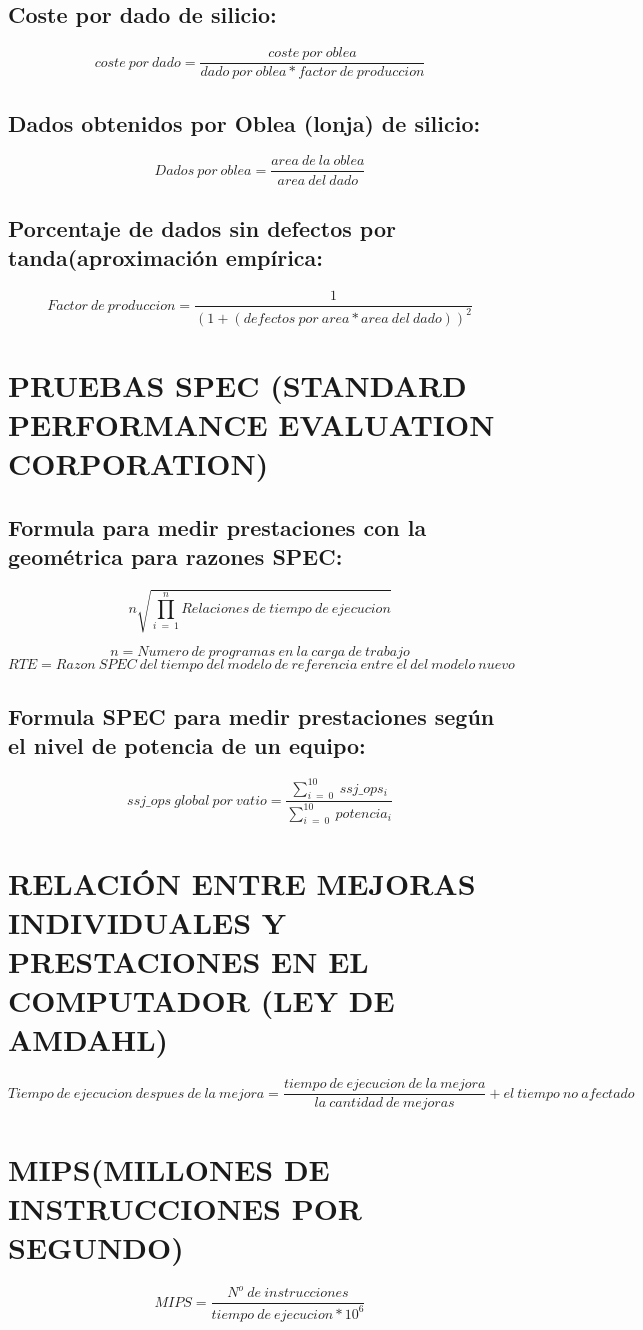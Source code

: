 \documentclass{article}
\begin{document}
\subsection{Coste por dado de silicio:}

$$coste\ por\ dado = \frac{coste\ por\ oblea}{dado\ por\ oblea * factor\ de\ produccion}$$

\subsection{Dados obtenidos por Oblea (lonja) de silicio:}

$$Dados\ por\ oblea = \frac{area\ de\ la\ oblea}{area\ del\ dado}$$

\subsection{Porcentaje de dados sin defectos por tanda(aproximación empírica:}

$$Factor\ de\ produccion =\frac{1}{(1 + (defectos\ por\ area * area\ del\ dado))^2}$$

\section{ \uppercase{Pruebas SPEC (Standard Performance Evaluation Corporation)} }

\subsection{Formula para medir prestaciones con la geométrica para razones SPEC:}

$$n\sqrt{\prod_{i\ =\ 1}^{n} Relaciones\ de\ tiempo\ de\ ejecucion}$$

$$n = Numero\ de\ programas\ en\ la\ carga\ de\ trabajo$$
$$RTE = Razon\ SPEC\ del\ tiempo\ del\ modelo\ de\ referencia\ entre\ el\ del\ modelo\ nuevo$$


\subsection{Formula SPEC para medir prestaciones según el nivel de potencia de un equipo:}

$$ssj\_ops\ global\ por\ vatio = \frac{\sum_{i\ =\ 0}^{10}\ ssj\_ops_{i}}{\sum_{i\ =\ 0}^{10}\ potencia_{i}}$$

\section{ \uppercase{Relación entre mejoras individuales y prestaciones en el computador (Ley de Amdahl)} }

$$Tiempo\ de\ ejecucion\ despues\ de\ la\ mejora = \frac{tiempo\ de\ ejecucion\ de\ la\ mejora}{la\ cantidad\ de\ mejoras} + el\ tiempo\ no\ afectado$$

\section{ \uppercase{MIPS(Millones de Instrucciones Por Segundo)} }

$$MIPS = \frac{N^o\ de\ instrucciones}{tiempo\ de\ ejecucion * 10^{6}}$$
\end{document}
